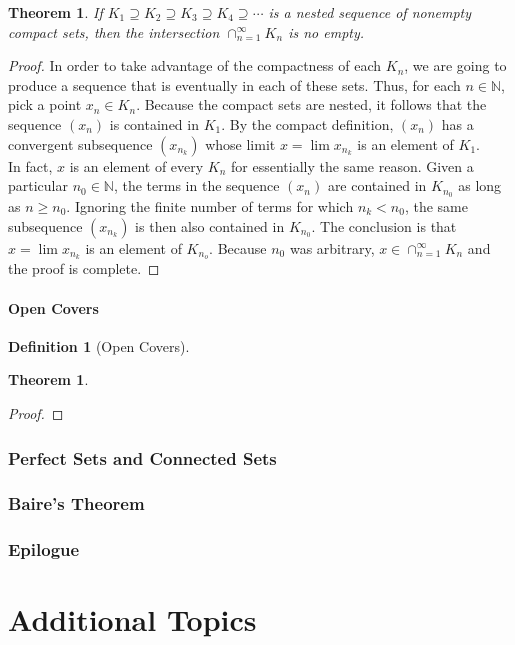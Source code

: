\documentclass[10pt]{report}
\newtheorem{thm2}{Theorem}[section]
\newtheorem{thm3}{Theorem}[subsection]
\newtheorem{def3}{Definition}[subsection]
\begin{document}
\begin{thm2}
If $K_1 \supseteq K_2 \supseteq K_3 \supseteq K_4 \supseteq \cdots$ is a nested sequence of nonempty compact sets, then the intersection $\cap_{n=1}^\infty K_n$ is no empty.
\end{thm2}
\begin{proof}
In order to take advantage of the compactness of each $K_n$, we are going to produce a sequence that is eventually in each of these sets. Thus, for each $n\in\mathbb{N}$, pick a point $x_n\in K_n$. Because the compact sets are nested, it follows that the sequence $(x_n)$ is contained in $K_1$. By the compact definition, $(x_n)$ has a convergent subsequence $(x_{n_k})$ whose limit $x=\lim x_{n_k}$ is an element of $K_1$.\\
In fact, $x$ is an element of every $K_n$ for essentially the same reason. Given a particular $n_0 \in\mathbb{N}$, the terms in the sequence $(x_n)$ are contained in $K_{n_0}$ as long as $n\geq n_0$. Ignoring the finite number of terms for which $n_k < n_0$, the same subsequence $(x_{n_k})$ is then also contained in $K_{n_0}$. The conclusion is that $x=\lim x_{n_k}$ is an element of $K_{n_o}$. Because $n_0$ was arbitrary, $x\in\cap_{n=1}^\infty K_n$ and the proof is complete.
\end{proof}
\subsection{Open Covers}
\begin{def3}[Open Covers]
\end{def3}
\begin{thm3}
\end{thm3}
\begin{proof}
\end{proof}
\section{Perfect Sets and Connected Sets}
\section{Baire's Theorem}
\section{Epilogue}
\part{Additional Topics}
\end{document}
